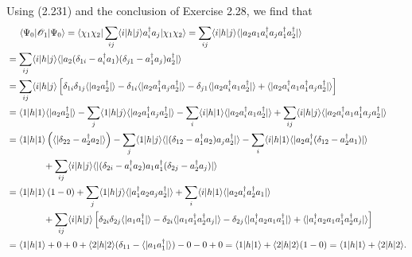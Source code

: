 \documentclass[a4paper]{book}
\newcounter{solution}[chapter]
\begin{document}
\begin{solution}
	Using (2.231) and the conclusion of Exercise 2.28, we find that
	\begin{align*}
		&\hspace{1.4em}\langle \Psi_0 | \mathscr{O}_1 | \Psi_0 \rangle = \langle \chi_1 \chi_2 | \sum_{ij} \langle i | h | j \rangle a^\dagger_i a_j | \chi_1 \chi_2 \rangle = \sum_{ij} \langle i | h | j \rangle \langle | a_2 a_1 a^\dagger_i a_j a^\dagger_1 a^\dagger_2 | \rangle \\
		&= \sum_{ij} \langle i | h | j \rangle \langle | a_2 ( \delta_{1i} - a^\dagger_i a_1 ) ( \delta_{j1} - a^\dagger_1 a_j ) a^\dagger_2 | \rangle \\
		&= \sum_{ij} \langle i | h | j \rangle \left[ \delta_{1i} \delta_{1j} \langle | a_2 a^\dagger_2 | \rangle - \delta_{1i} \langle | a_2 a^\dagger_1 a_j a^\dagger_2 | \rangle - \delta_{j1} \langle | a_2 a^\dagger_i a_1 a^\dagger_2 | \rangle + \langle | a_2 a^\dagger_i a_1 a^\dagger_1 a_j a^\dagger_2 | \rangle \right] \\
		&= \langle 1 | h | 1 \rangle \langle | a_2 a^\dagger_2 | \rangle - \sum_j \langle 1 | h | j \rangle \langle | a_2 a^\dagger_1 a_j a^\dagger_2 | \rangle - \sum_i \langle i | h | 1 \rangle \langle | a_2 a^\dagger_i a_1 a^\dagger_2 | \rangle + \sum_{ij} \langle i | h | j \rangle \langle | a_2 a^\dagger_i a_1 a^\dagger_1 a_j a^\dagger_2 | \rangle \\
		&= \langle 1 | h | 1 \rangle \left( \langle | \delta_{22} - a^\dagger_2 a_2 | \rangle \right) - \sum_j \langle 1 | h | j \rangle \langle | ( \delta_{12} - a^\dagger_1 a_2 )  a_j a^\dagger_2 | \rangle - \sum_i \langle i | h | 1 \rangle \langle | a_2 a^\dagger_i ( \delta_{12} - a^\dagger_2 a_1 ) | \rangle \\
		&\hspace{4em} + \sum_{ij} \langle i | h | j \rangle \langle | ( \delta_{2i} - a^\dagger_i a_2 ) a_1 a^\dagger_1 ( \delta_{2j} - a^\dagger_2 a_j ) | \rangle \\
		&= \langle 1 | h | 1 \rangle \left( 1 - 0 \right) + \sum_j \langle 1 | h | j \rangle \langle | a^\dagger_1 a_2 a_j a^\dagger_2 | \rangle + \sum_i \langle i | h | 1 \rangle \langle | a_2 a^\dagger_i a^\dagger_2 a_1 | \rangle \\
		&\hspace{4em} + \sum_{ij} \langle i | h | j \rangle \left[ \delta_{2i} \delta_{2j} \langle | a_1 a^\dagger_1 | \rangle - \delta_{2i} \langle | a_1 a^\dagger_1 a^\dagger_2 a_j | \rangle - \delta_{2j} \langle | a^\dagger_i a_2 a_1 a^\dagger_1 | \rangle + \langle | a^\dagger_i a_2 a_1 a^\dagger_1 a^\dagger_2 a_j | \rangle \right] \\
		&= \langle 1 | h | 1 \rangle + 0 + 0 + \langle 2 | h | 2 \rangle ( \delta_{11} - \langle | a_1 a^\dagger_1 | \rangle ) - 0 - 0 + 0 = \langle 1 | h | 1 \rangle + \langle 2 | h | 2 \rangle ( 1 - 0 ) = \langle 1 | h | 1 \rangle + \langle 2 | h | 2 \rangle.
	\end{align*}		
	
	\end{solution}
	
\end{document}
